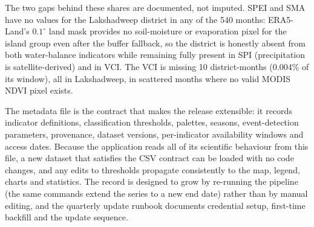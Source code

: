 \documentclass[10pt,a4paper]{article}
\begin{document}
The two gaps behind these shares are documented, not imputed. SPEI and SMA have no values for the Lakshadweep district in any of the 540 months: ERA5-Land's $0.1^\circ$ land mask provides no soil-moisture or evaporation pixel for the island group even after the buffer fallback, so the district is honestly absent from both water-balance indicators while remaining fully present in SPI (precipitation is satellite-derived) and in VCI. The VCI is missing 10 district-months (0.004\% of its window), all in Lakshadweep, in scattered months where no valid MODIS NDVI pixel exists.

The metadata file is the contract that makes the release extensible: it records indicator definitions, classification thresholds, palettes, seasons, event-detection parameters, provenance, dataset versions, per-indicator availability windows and access dates. Because the application reads all of its scientific behaviour from this file, a new dataset that satisfies the CSV contract can be loaded with no code changes, and any edits to thresholds propagate consistently to the map, legend, charts and statistics. The record is designed to grow by re-running the pipeline (the same commands extend the series to a new end date) rather than by manual editing, and the quarterly update runbook documents credential setup, first-time backfill and the update sequence.
\end{document}
